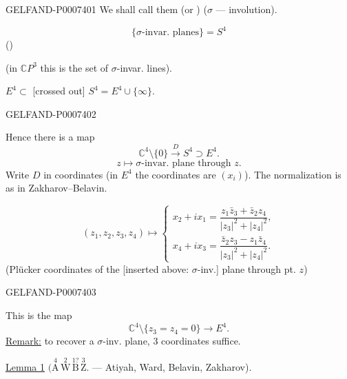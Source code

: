 \begin{GelfandAdjacentEvidence}{GELFAND-P000740}{1}
We shall call them  (or )
(\(\sigma\) --- involution).

\begin{equation*}
\tag*{(6)\hfill}
\{\sigma\text{-invar. planes}\}=S^4
\end{equation*}
()

(in \(\mathbb C P^3\) this is the set of \(\sigma\)-invar. lines).

\(E^4\subset\) [crossed out] \(S^4=E^4\cup\{\infty\}\).
\end{GelfandAdjacentEvidence}
\begin{GelfandAdjacentEvidence}{GELFAND-P000740}{2}


Hence there is a map
\begin{equation*}
\tag*{(7)\hfill}
\mathbb C^4\setminus\{0\}\overset{D}{\longrightarrow}S^4\supset E^4.
\end{equation*}
\[
z\longmapsto \sigma\text{-invar. plane through }z.
\]
Write \(D\) in coordinates (\(\text{in } E^4\) the coordinates are \((x_i)\)).
The normalization is as in Zakharov–Belavin.

\[
(z_1,z_2,z_3,z_4)\longmapsto
\begin{cases}
x_2+i x_1=\dfrac{z_1\bar z_3+\bar z_2 z_4}{|z_3|^2+|z_4|^2},\\[6pt]
x_4+i x_3=\dfrac{\bar z_2 z_3-z_1\bar z_4}{|z_3|^2+|z_4|^2}.
\end{cases}
\]
(Plücker coordinates of the [inserted above: \(\sigma\)-inv.] plane through pt. \(z\))
\end{GelfandAdjacentEvidence}
\begin{GelfandAdjacentEvidence}{GELFAND-P000740}{3}


This is the map
\[
\mathbb C^4\setminus\{z_3=z_4=0\}\longrightarrow E^4.
\]
\underline{Remark:} to recover a \(\sigma\)-inv. plane, 3 coordinates suffice.

\underline{\underline{Lemma 1}}
\(\bigl(\overset{4}{\text{A}}\,
\overset{2}{\text{W}}\,
\overset{1?}{\text{B}}\,
\overset{3}{\text{Z}}\bigr.\)
--- Atiyah, Ward, Belavin, Zakharov).
\end{GelfandAdjacentEvidence}
